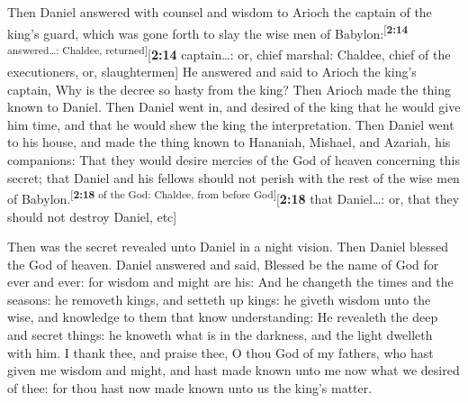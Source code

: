  Then Daniel answered with counsel and wisdom to Arioch
the captain of the king's guard, which was gone forth to slay the wise
men of Babylon:\textsuperscript{{[}\textbf{2:14} answered\ldots:
Chaldee, returned{]}}{[}\textbf{2:14} captain\ldots: or, chief marshal:
Chaldee, chief of the executioners, or, slaughtermen{]} 
He answered and said to Arioch the king's captain, Why is the decree so
hasty from the king? Then Arioch made the thing known to Daniel.
 Then Daniel went in, and desired of the king that he
would give him time, and that he would shew the king the interpretation.
 Then Daniel went to his house, and made the thing known
to Hananiah, Mishael, and Azariah, his companions:  That
they would desire mercies of the God of heaven concerning this secret;
that Daniel and his fellows should not perish with the rest of the wise
men of Babylon.\textsuperscript{{[}\textbf{2:18} of the God: Chaldee,
from before God{]}}{[}\textbf{2:18} that Daniel\ldots: or, that they
should not destroy Daniel, etc{]}

 Then was the secret revealed unto Daniel in a night
vision. Then Daniel blessed the God of heaven.  Daniel
answered and said, Blessed be the name of God for ever and ever: for
wisdom and might are his:  And he changeth the times and
the seasons: he removeth kings, and setteth up kings: he giveth wisdom
unto the wise, and knowledge to them that know understanding:
 He revealeth the deep and secret things: he knoweth what
is in the darkness, and the light dwelleth with him.  I
thank thee, and praise thee, O thou God of my fathers, who hast given me
wisdom and might, and hast made known unto me now what we desired of
thee: for thou hast now made known unto us the king's matter.

